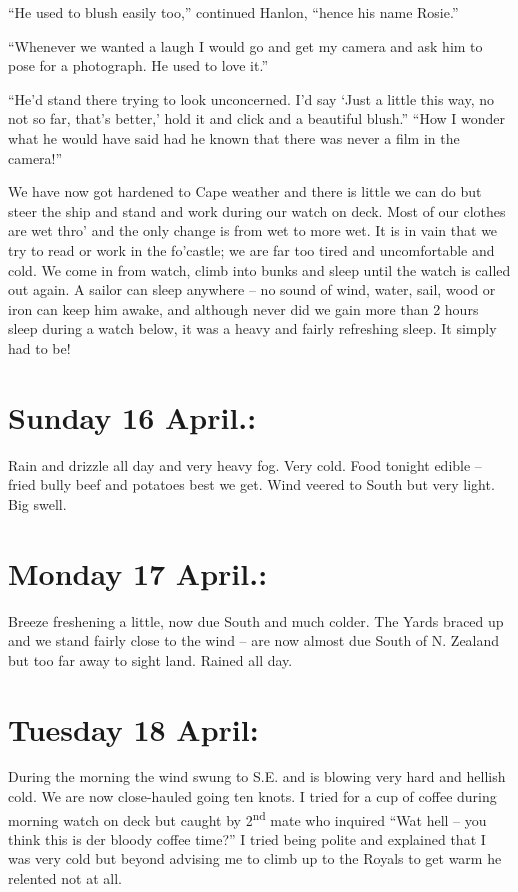 \documentclass[
  11pt,
  msmallroyalvopaper
]{memoir}
\begin{document}
``He used to blush easily too,'' continued Hanlon, ``hence his name
Rosie.''

``Whenever we wanted a laugh I would go and get my camera and ask him to
pose for a photograph. He used to love it.''

``He'd stand there trying to look unconcerned. I'd say `Just a little
this way, no not so far, that's better,' hold it and click and a
beautiful blush.'' ``How I wonder what he would have said had he known
that there was never a film in the camera!''

We have now got hardened to Cape weather and there is little we can do
but steer the ship and stand and work during our watch on deck. Most of
our clothes are wet thro' and the only change is from wet to more wet.
It is in vain that we try to read or work in the fo'castle; we are far
too tired and uncomfortable and cold. We come in from watch, climb into
bunks and sleep until the watch is called out again. A sailor can sleep
anywhere -- no sound of wind, water, sail, wood or iron can keep him
awake, and although never did we gain more than 2 hours sleep during a
watch below, it was a heavy and fairly refreshing sleep. It simply had
to be!

\hypertarget{sunday-16-april.}{%
\section{Sunday 16 April.:}\label{sunday-16-april.}}

Rain and drizzle all day and very heavy fog. Very cold. Food tonight
edible -- fried bully beef and potatoes best we get. Wind veered to
South but very light. Big swell.

\hypertarget{monday-17-april.}{%
\section{Monday 17 April.:}\label{monday-17-april.}}

Breeze freshening a little, now due South and much colder. The Yards
braced up and we stand fairly close to the wind -- are now almost due
South of N. Zealand but too far away to sight land. Rained all day.

\hypertarget{tuesday-18-april}{%
\section{Tuesday 18 April:}\label{tuesday-18-april}}

During the morning the wind swung to S.E. and is blowing very hard and
hellish cold. We are now close-hauled going ten knots. I tried for a cup
of coffee during morning watch on deck but caught by
2\textsuperscript{nd} mate who inquired ``Wat hell -- you think this is
der bloody coffee time?'' I tried being polite and explained that I was
very cold but beyond advising me to climb up to the Royals to get warm
he relented not at all.
\end{document}
